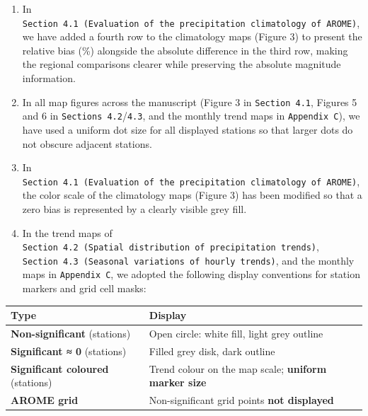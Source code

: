 \documentclass[
  letterpaper,
  DIV=11,
  numbers=noendperiod]{scrartcl}
\begin{document}
\begin{enumerate}
\def\labelenumi{\arabic{enumi}.}
\item
  In
  \texttt{Section\ 4.1\ (Evaluation\ of\ the\ precipitation\ climatology\ of\ AROME)},
  we have added a fourth row to the climatology maps (Figure 3) to
  present the relative bias (\%) alongside the absolute difference in
  the third row, making the regional comparisons clearer while
  preserving the absolute magnitude information.
\item
  In all map figures across the manuscript (Figure 3 in
  \texttt{Section\ 4.1}, Figures 5 and 6 in
  \texttt{Sections\ 4.2}/\texttt{4.3}, and the monthly trend maps in
  \texttt{Appendix\ C}), we have used a uniform dot size for all
  displayed stations so that larger dots do not obscure adjacent
  stations.
\item
  In
  \texttt{Section\ 4.1\ (Evaluation\ of\ the\ precipitation\ climatology\ of\ AROME)},
  the color scale of the climatology maps (Figure 3) has been modified
  so that a zero bias is represented by a clearly visible grey fill.
\item
  In the trend maps of
  \texttt{Section\ 4.2\ (Spatial\ distribution\ of\ precipitation\ trends)},
  \texttt{Section\ 4.3\ (Seasonal\ variations\ of\ hourly\ trends)}, and
  the monthly maps in \texttt{Appendix\ C}, we adopted the following
  display conventions for station markers and grid cell masks:
\end{enumerate}

\begin{longtable}[]{@{}
  >{\raggedright\arraybackslash}p{}
  >{\raggedright\arraybackslash}p{}@{}}
\toprule\noalign{}
\begin{minipage}[b]{\linewidth}\raggedright
Type
\end{minipage} & \begin{minipage}[b]{\linewidth}\raggedright
Display
\end{minipage} \\
\midrule\noalign{}
\endhead
\bottomrule\noalign{}
\endlastfoot
\textbf{Non-significant} (stations) & Open circle: white fill, light
grey outline \\
\textbf{Significant ≈ 0} (stations) & Filled grey disk, dark outline \\
\textbf{Significant coloured} (stations) & Trend colour on the map
scale; \textbf{uniform marker size} \\
\textbf{AROME grid} & Non-significant grid points \textbf{not
displayed} \\
\end{longtable}
\end{document}
